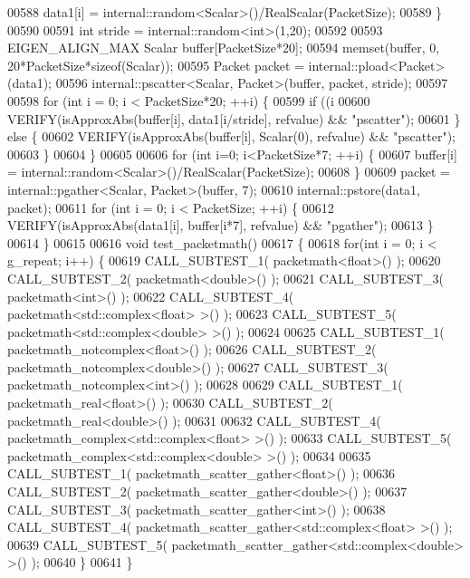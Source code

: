 \begin{DoxyCode}
00588     data1[i] = internal::random<Scalar>()/RealScalar(PacketSize);
00589   \}
00590 
00591   \textcolor{keywordtype}{int} stride = internal::random<int>(1,20);
00592 
00593   EIGEN\_ALIGN\_MAX Scalar buffer[PacketSize*20];
00594   memset(buffer, 0, 20*PacketSize*\textcolor{keyword}{sizeof}(Scalar));
00595   Packet packet = internal::pload<Packet>(data1);
00596   internal::pscatter<Scalar, Packet>(buffer, packet, stride);
00597 
00598   \textcolor{keywordflow}{for} (\textcolor{keywordtype}{int} i = 0; i < PacketSize*20; ++i) \{
00599     \textcolor{keywordflow}{if} ((i%
00600       VERIFY(isApproxAbs(buffer[i], data1[i/stride], refvalue) && \textcolor{stringliteral}{"pscatter"});
00601     \} \textcolor{keywordflow}{else} \{
00602       VERIFY(isApproxAbs(buffer[i], Scalar(0), refvalue) && \textcolor{stringliteral}{"pscatter"});
00603     \}
00604   \}
00605 
00606   \textcolor{keywordflow}{for} (\textcolor{keywordtype}{int} i=0; i<PacketSize*7; ++i) \{
00607     buffer[i] = internal::random<Scalar>()/RealScalar(PacketSize);
00608   \}
00609   packet = internal::pgather<Scalar, Packet>(buffer, 7);
00610   internal::pstore(data1, packet);
00611   \textcolor{keywordflow}{for} (\textcolor{keywordtype}{int} i = 0; i < PacketSize; ++i) \{
00612     VERIFY(isApproxAbs(data1[i], buffer[i*7], refvalue) && \textcolor{stringliteral}{"pgather"});
00613   \}
00614 \}
00615 
00616 \textcolor{keywordtype}{void} test\_packetmath()
00617 \{
00618   \textcolor{keywordflow}{for}(\textcolor{keywordtype}{int} i = 0; i < g\_repeat; i++) \{
00619     CALL\_SUBTEST\_1( packetmath<float>() );
00620     CALL\_SUBTEST\_2( packetmath<double>() );
00621     CALL\_SUBTEST\_3( packetmath<int>() );
00622     CALL\_SUBTEST\_4( packetmath<std::complex<float> >() );
00623     CALL\_SUBTEST\_5( packetmath<std::complex<double> >() );
00624 
00625     CALL\_SUBTEST\_1( packetmath\_notcomplex<float>() );
00626     CALL\_SUBTEST\_2( packetmath\_notcomplex<double>() );
00627     CALL\_SUBTEST\_3( packetmath\_notcomplex<int>() );
00628 
00629     CALL\_SUBTEST\_1( packetmath\_real<float>() );
00630     CALL\_SUBTEST\_2( packetmath\_real<double>() );
00631 
00632     CALL\_SUBTEST\_4( packetmath\_complex<std::complex<float> >() );
00633     CALL\_SUBTEST\_5( packetmath\_complex<std::complex<double> >() );
00634 
00635     CALL\_SUBTEST\_1( packetmath\_scatter\_gather<float>() );
00636     CALL\_SUBTEST\_2( packetmath\_scatter\_gather<double>() );
00637     CALL\_SUBTEST\_3( packetmath\_scatter\_gather<int>() );
00638     CALL\_SUBTEST\_4( packetmath\_scatter\_gather<std::complex<float> >() );
00639     CALL\_SUBTEST\_5( packetmath\_scatter\_gather<std::complex<double> >() );
00640   \}
00641 \}
\end{DoxyCode}
